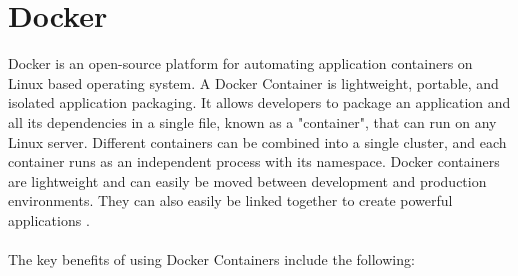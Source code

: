 \documentclass[BIF,Master,nenglish]{twbook}
\begin{document}
\section{Docker}
Docker is an open-source platform for automating application containers on Linux based operating system. A Docker Container is lightweight, portable, and isolated application packaging. It allows developers to package an application and all its dependencies in a single file, known as a "container", that can run on any Linux server. Different containers can be combined into a single cluster, and each container runs as an independent process with its namespace. Docker containers are lightweight and can easily be moved between development and production environments. They can also easily be linked together to create powerful applications \cite{rad2017}.
\\
\\
The key benefits of using Docker Containers include the following: 
\end{document}
